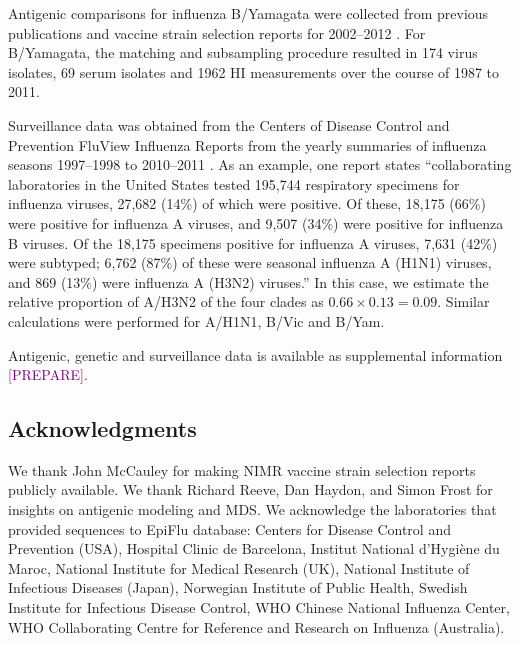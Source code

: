 \documentclass[11pt,oneside,letterpaper]{article}
\def\tbc#1{\textcolor{purple}{[#1]}}
\begin{document}
Antigenic comparisons for influenza B/Yamagata were collected from previous publications \cite{Rota90, Kanegae90, Nakajima92, Nerome98, Hay01, Muyanga01, Nakagawa02, Abed03, Ansaldi03, Ansaldi04, Matsuzaki04, Puzelli04, Shaw02, Xu04, Barr06, Daum06, Lin07} and vaccine strain selection reports for 2002--2012 \cite{AusWHO06, NIMR02, NIMR03, NIMR04, NIMRFeb05, NIMRSep05, NIMRMarch06, NIMRSep06, NIMRMarch07, NIMRSep07, NIMRMarch08, NIMRFeb09, NIMRSep09, NIMRFeb10, NIMRSep10, NIMRFeb11, NIMRSep11, NIMRFeb12}.
For B/Yamagata, the matching and subsampling procedure resulted in 174 virus isolates, 69 serum isolates and 1962 HI measurements over the course of 1987 to 2011.

Surveillance data was obtained from the Centers of Disease Control and Prevention FluView Influenza Reports from the yearly summaries of influenza seasons 1997--1998 to 2010--2011 \cite{CDCReports}.
As an example, one report states ``collaborating laboratories in the United States tested 195,744 respiratory specimens for influenza viruses, 27,682 (14\%) of which were positive. Of these, 18,175 (66\%) were positive for influenza A viruses, and 9,507 (34\%) were positive for influenza B viruses. Of the 18,175 specimens positive for influenza A viruses, 7,631 (42\%) were subtyped; 6,762 (87\%) of these were seasonal influenza A (H1N1) viruses, and 869 (13\%) were influenza A (H3N2) viruses.''
In this case, we estimate the relative proportion of A/H3N2 of the four clades as $0.66 \times 0.13 = 0.09$.
Similar calculations were performed for A/H1N1, B/Vic and B/Yam.

Antigenic, genetic and surveillance data is available as supplemental information \tbc{PREPARE}.

\subsection*{Acknowledgments} 

We thank John McCauley for making NIMR vaccine strain selection reports publicly available.
We thank Richard Reeve, Dan Haydon, and Simon Frost for insights on antigenic modeling and MDS.
We acknowledge the laboratories that provided sequences to EpiFlu database: Centers for Disease Control and Prevention (USA), Hospital Clinic de Barcelona, Institut National d'Hygi\`{e}ne du Maroc, National Institute for Medical Research (UK), National Institute of Infectious Diseases (Japan), Norwegian Institute of Public Health, Swedish Institute for Infectious Disease Control, WHO Chinese National Influenza Center, WHO Collaborating Centre for Reference and Research on Influenza (Australia).
\end{document}
